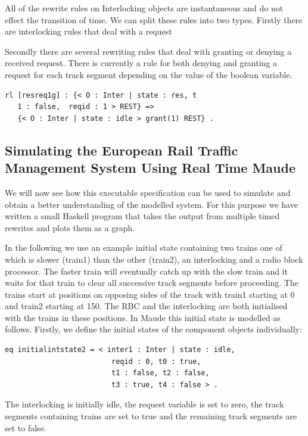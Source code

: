 All of the rewrite rules on Interlocking objects are instantaneous and do not effect the transition of time.  We can split these rules into two types. Firstly there are interlocking rules that deal with a request


Secondly there are several rewriting rules that deal with granting or denying a received request. There is currently a rule for both denying and granting a request for each track segment depending on the value of the boolean variable.
\begin{lstlisting}[caption = The interlocking transition which grants a track segment request]
rl [resreq1g] : {< O : Inter | state : res, t
   1 : false,  reqid : 1 > REST} => 
   {< O : Inter | state : idle > grant(1) REST} .
\end{lstlisting}

\subsection{Simulating the European Rail Traffic Management System Using Real Time Maude}
We will now see how this executable specification can be used to simulate and obtain a better understanding of the modelled system. For this purpose we have written a small Haskell program that takes the output from multiple timed rewrites and plots them as a graph.

In the following we use an example initial state containing two trains one of which is slower (train1) than the other (train2), an interlocking and a radio block processor. The faster train will eventually catch up with the slow train and it waits for that train to clear all successive track segments before proceeding. The trains start at positions on opposing sides of the track with train1 starting at 0 and train2 starting at 150. The RBC and the interlocking are both initialised with the trains in these positions. In Maude this initial state is modelled as follows. Firstly, we define the initial states of the component objects individually:

\begin{lstlisting}[caption = The initial interlocking state in Maude]
 eq initialintstate2 = < inter1 : Inter | state : idle, 
                         reqid : 0, t0 : true, 
                         t1 : false, t2 : false, 
                         t3 : true, t4 : false > .
\end{lstlisting}

The  interlocking is initially idle, the request variable is set to zero, the track segments containing trains are set to true and the remaining track segments are set to false.

